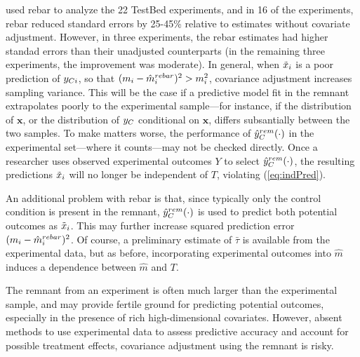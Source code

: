 \citet{rebarEDM} used rebar to analyze the 22 TestBed experiments, and
in 16 of the experiments, rebar reduced standard
errors by 25-45\% relative to estimates without covariate adjustment.
However, in three experiments, the rebar estimates had higher standad
errors than their unadjusted counterparts (in the remaining three
experiments, the improvement was moderate).
In general, when $\tilde{x}_i$ is a poor
prediction of $y_{Ci}$, so that $(m_i-\hat{m}_i^{rebar})^2>m_i^2$, covariance
adjustment increases sampling variance.
This will be the case if a predictive model fit in the remnant
extrapolates poorly to the experimental sample---for instance, if the
distribution of $\bm{x}$, or the distribution of $y_C$
conditional on $\bm{x}$, differs subsantially between the two samples.
To make matters worse, the performance of $\hat{y}_C^{rem}(\cdot)$ in the
experimental set---where it counts---may not be checked directly.
Once a researcher uses observed experimental outcomes $Y$ to select
$\hat{y}_C^{rem}(\cdot)$, the resulting predictions $\tilde{x}_i$
will no longer be independent of $T$, violating
(\ref{eq:indPred}).

An additional problem with rebar is that, since typically only the
control condition is present in the remnant, $\hat{y}_C^{rem}(\cdot)$ is used
to predict both potential outcomes as $\tilde{x}_i$.
This may further increase squared prediction error $(m_i-\hat{m}_i^{rebar})^2$.
Of course, a preliminary estimate of $\bar{\tau}$ is available from
the experimental data, but as before, incorporating experimental
outcomes into $\hat{m}$ induces a dependence between $\hat{m}$ and
$T$.

The remnant from an experiment is often much larger than the
experimental sample, and may provide fertile ground for predicting
potential outcomes, especially in the presence of rich
high-dimensional covariates.
However, absent methods to use experimental data to assess predictive
accuracy and account for possible treatment effects, covariance
adjustment using the remnant is risky.
